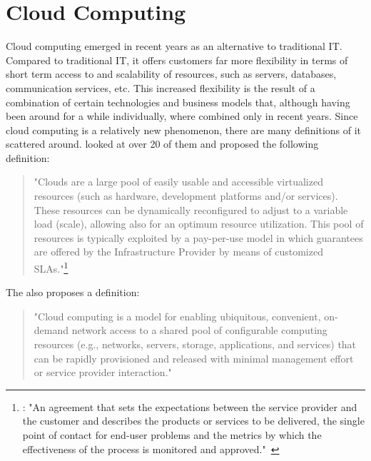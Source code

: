 \section{Cloud Computing}
\label{fundamentals:cloud}

Cloud computing emerged in recent years as an alternative to traditional IT.
Compared to traditional IT, it offers customers far more flexibility in terms of short term access to and scalability of resources, such as servers, databases, communication services, etc.
This increased flexibility is the result of a combination of certain technologies and business models that, although having been around for a while individually, where combined only in recent years.
Since cloud computing is a relatively new phenomenon, there are many definitions of it scattered around. \citeauthor*{cloud:def:towards} looked at over 20 of them and proposed the following definition:

\begin{quote}
	"Clouds are a large pool of easily usable and accessible virtualized resources (such as hardware, development platforms and/or services). These resources can be dynamically reconfigured to adjust to a variable load (scale), allowing also for an optimum resource utilization. This pool of resources is typically exploited by a pay-per-use model in which guarantees are offered by the Infrastructure Provider by means of customized SLAs."\footnote{: "An agreement that sets the expectations between the service provider and the customer and describes the products or services to be delivered, the single point of contact for end-user problems and the metrics by which the effectiveness of the process is monitored and approved."~\autocite{def:sla}}~\autocite{cloud:def:towards}
\end{quote}

The  also proposes a definition:

\begin{quote}
	"Cloud computing is a model for enabling ubiquitous, convenient, on-demand network access to a shared pool of configurable computing resources (e.g., networks, servers, storage, applications, and services) that can be rapidly provisioned and released with minimal management effort or service provider interaction."~\autocite{cloud:def:nist}
\end{quote}

